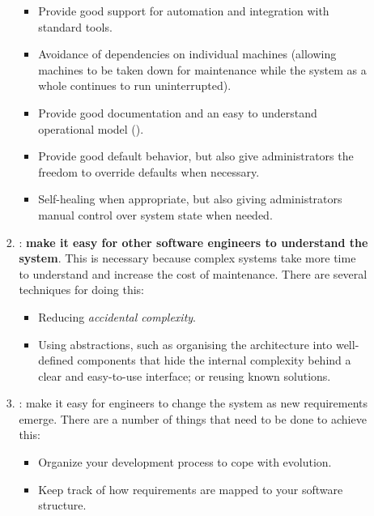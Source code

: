 \begin{itemize}
\begin{itemize}
\begin{enumerate}
\begin{itemize}
                \item Provide good support for automation and integration with standard tools.

                \item Avoidance of dependencies on individual machines (allowing machines to be taken down for maintenance while the system as a whole continues to run uninterrupted).

                \item Provide good documentation and an easy to understand operational model ().

                \item Provide good default behavior, but also give administrators the freedom to override defaults when necessary.

                \item Self-healing when appropriate, but also giving administrators manual control over system state when needed.
            \end{itemize}
            
            \item {}: \textbf{make it easy for other software engineers to understand the system}. This is necessary because complex systems take more time to understand and increase the cost of maintenance. There are several techniques for doing this:
            \begin{itemize}
                \item Reducing \emph{accidental complexity}.
                
                \item Using abstractions, such as organising the architecture into well-defined components that hide the internal complexity behind a clear and easy-to-use interface; or reusing known solutions.
            \end{itemize}

            \item {}: make it easy for engineers to change the system as new requirements emerge. There are a number of things that need to be done to achieve this:
            \begin{itemize}
                \item Organize your development process to cope with evolution.
                
                \item Keep track of how requirements are mapped to your software structure.


\end{itemize}
\end{enumerate}
\end{itemize}
\end{itemize}
